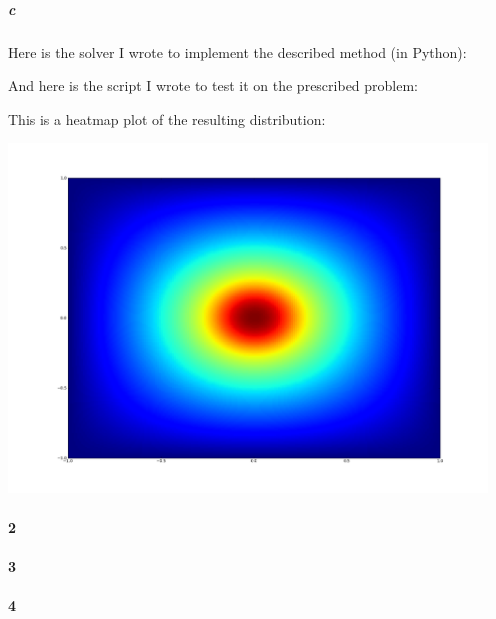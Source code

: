 \documentclass{article}
\begin{document}
\subparagraph{c}

Here is the solver I wrote to implement the described method (in Python):

\pagebreak


And here is the script I wrote to test it on the prescribed problem:



This is a heatmap plot of the resulting distribution:

\begin{center}
\includegraphics[width=5in]{prob1_result.png}
\end{center}

\paragraph{2}


\paragraph{3}

\paragraph{4}
\end{document}
